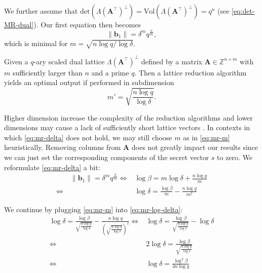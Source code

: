 We further assume that $\text{det}(\Lambda(\mathbf{A}^\intercal)^{\perp}) = \text{Vol}(\Lambda(\mathbf{A}^\intercal)^{\perp}) = q^n$ (see \cref{eq:det-MR-dual}). Our first equation then becomes
\begin{equation}\label{eq:mr-delta}
  \|\mathbf{b}_1\| = \delta^m q^{\frac{n}{m}},
\end{equation}
which is minimal for $m = \sqrt{n \log q / \log \delta}$.
\begin{theorem}
  Given a $q$-ary scaled dual lattice  $\Lambda(\mathbf{A}^\intercal)^{\perp}$ defined by a matrix $\mathbf{A} \in \mathbb{Z}^{n \times m}$ with $m$ sufficiently larger than $n$ and a prime $q$. Then a lattice reduction algorithm yields an optimal output if performed in subdimension
  \begin{equation}
    m' = \sqrt{\frac{n \log q}{\log \delta}}. \label{eq:mr-m}
  \end{equation}
\end{theorem}

Higher dimension increase the complexity of the reduction algorithms and lower dimensions may cause a lack of sufficiently short lattice vectors \cite{MR09}. In contexts in which \cref{eq:mr-delta} does not hold, we may still choose $m$ as in \cref{eq:mr-m} heuristically. Removing columns from $\mathbf{A}$ does not greatly impact our results since we can just set the corresponding components of the secret vector $s$ to zero. We reformulate \cref{eq:mr-delta} a bit:
\begin{align}
  \qquad\|\mathbf{b}_1\| = \delta^m q^{\frac{n}{m}} \iff & \log \beta = m \log \delta + \frac{n \log q}{m}   \nonumber                       \\
  \iff                                                   & \log \delta = \frac{\log \beta}{m} - \frac{n \log q}{m^2} \label{eq:mr-log-delta}
\end{align}

We continue by plugging \cref{eq:mr-m} into \cref{eq:mr-log-delta}:
\begin{align}
  \log \delta = \frac{\log \beta}{\sqrt{\frac{n \log q}{\log \delta}}} - \frac{n \log q}{\left(\sqrt{\frac{n \log q}{\log \delta}}\right)^2} \iff & \log \delta = \frac{\log \beta}{\sqrt{\frac{n \log q}{\log \delta}}} - \log \delta \nonumber \\
  \iff                                                                                                                                            & 2\log \delta = \frac{\log \beta}{\sqrt{\frac{n \log q}{\log \delta}}}              \nonumber \\
  \iff                                                                                                                                            & \log \delta = \frac{\log^2 \beta}{4n \log q}
\end{align}

